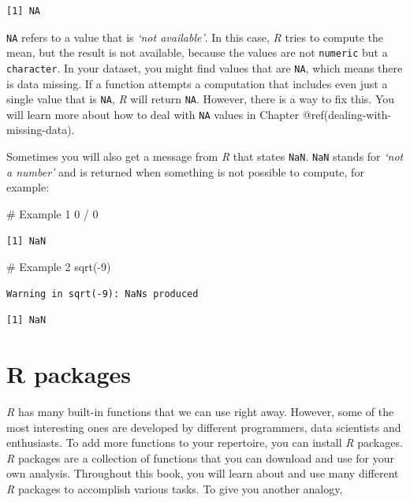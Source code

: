 \documentclass[
  letterpaper,
]{krantz}
\makeatletter
\newenvironment{Shaded}{\begin{snugshade}}{\end{snugshade}}
\newcommand{\CommentTok}[1]{\textcolor[rgb]{0.37,0.37,0.37}{#1}}
\newcommand{\DecValTok}[1]{\textcolor[rgb]{0.68,0.00,0.00}{#1}}
\newcommand{\FunctionTok}[1]{\textcolor[rgb]{0.28,0.35,0.67}{#1}}
\newcommand{\NormalTok}[1]{\textcolor[rgb]{0.00,0.23,0.31}{#1}}
\newcommand{\SpecialCharTok}[1]{\textcolor[rgb]{0.37,0.37,0.37}{#1}}
\newenvironment{kframe}{%
\medskip{}
\setlength{\fboxsep}{.8em}
 \def\at@end@of@kframe{}%
 \ifinner\ifhmode%
  \def\at@end@of@kframe{\end{minipage}}%
  \begin{minipage}{\columnwidth}%
 \fi\fi%
 \def\FrameCommand##1{\hskip\@totalleftmargin \hskip-\fboxsep
 \colorbox{shadecolor}{##1}\hskip-\fboxsep
     \hskip-\linewidth \hskip-\@totalleftmargin \hskip\columnwidth}%
 \MakeFramed {\advance\hsize-\width
   \@totalleftmargin\z@ \linewidth\hsize
   \@setminipage}}%
 {\par\unskip\endMakeFramed%
 \at@end@of@kframe}
\renewenvironment{Shaded}{\begin{kframe}}{\end{kframe}}
\makeatother
\begin{document}
\begin{verbatim}
[1] NA
\end{verbatim}

\texttt{NA} refers to a value that is \emph{`not available'}. In this
case, \emph{R} tries to compute the mean, but the result is not
available, because the values are not \texttt{numeric} but a
\texttt{character}. In your dataset, you might find values that are
\texttt{NA}, which means there is data missing. If a function attempts a
computation that includes even just a single value that is \texttt{NA},
\emph{R} will return \texttt{NA}. However, there is a way to fix this.
You will learn more about how to deal with \texttt{NA} values in Chapter
@ref(dealing-with-missing-data).

Sometimes you will also get a message from \emph{R} that states
\texttt{NaN}. \texttt{NaN} stands for \emph{`not a number'} and is
returned when something is not possible to compute, for example:

\begin{Shaded}
\begin{Highlighting}[]
\CommentTok{\# Example 1}
\DecValTok{0} \SpecialCharTok{/} \DecValTok{0}
\end{Highlighting}
\end{Shaded}

\begin{verbatim}
[1] NaN
\end{verbatim}

\begin{Shaded}
\begin{Highlighting}[]
\CommentTok{\# Example 2}
\FunctionTok{sqrt}\NormalTok{(}\SpecialCharTok{{-}}\DecValTok{9}\NormalTok{)}
\end{Highlighting}
\end{Shaded}

\begin{verbatim}
Warning in sqrt(-9): NaNs produced
\end{verbatim}

\begin{verbatim}
[1] NaN
\end{verbatim}

\section{R packages}\label{sec-r-packages}

\emph{R} has many built-in functions that we can use right away.
However, some of the most interesting ones are developed by different
programmers, data scientists and enthusiasts. To add more functions to
your repertoire, you can install \emph{R} packages. \emph{R} packages
are a collection of functions that you can download and use for your own
analysis. Throughout this book, you will learn about and use many
different \emph{R} packages to accomplish various tasks. To give you
another analogy,
\end{document}
